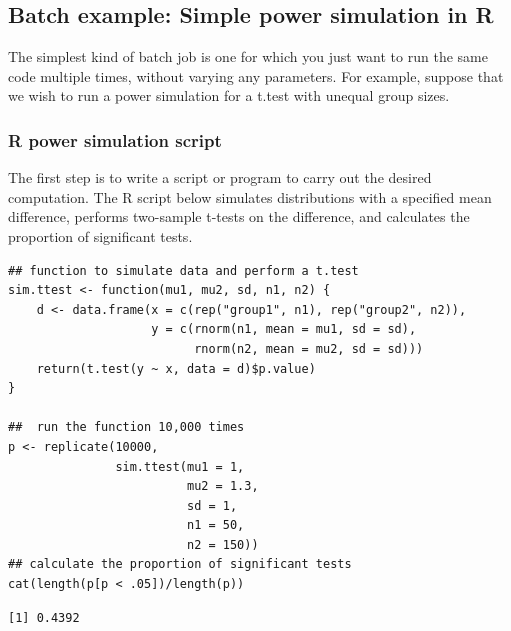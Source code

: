 \documentclass[11pt]{article}
\begin{document}
\subsection{Batch example: Simple power simulation in R}
\label{sec-7-3}
The simplest kind of batch job is one for which you just want to run the same code multiple times, without varying any parameters. For example, suppose that we wish to run a power simulation for a t.test with unequal group sizes. 

\subsubsection{R power simulation script}
\label{sec-7-3-1}
The first step is to write a script or program to carry out the desired computation. The R script below simulates distributions with a specified mean difference, performs two-sample t-tests on the difference, and calculates the proportion of significant tests.
\begin{verbatim}
## function to simulate data and perform a t.test
sim.ttest <- function(mu1, mu2, sd, n1, n2) {
    d <- data.frame(x = c(rep("group1", n1), rep("group2", n2)),
                    y = c(rnorm(n1, mean = mu1, sd = sd),
                          rnorm(n2, mean = mu2, sd = sd)))
    return(t.test(y ~ x, data = d)$p.value)
}

##  run the function 10,000 times 
p <- replicate(10000,
               sim.ttest(mu1 = 1,
                         mu2 = 1.3,
                         sd = 1,
                         n1 = 50,
                         n2 = 150))
## calculate the proportion of significant tests
cat(length(p[p < .05])/length(p))
\end{verbatim}

\begin{verbatim}
[1] 0.4392
\end{verbatim}
\end{document}
